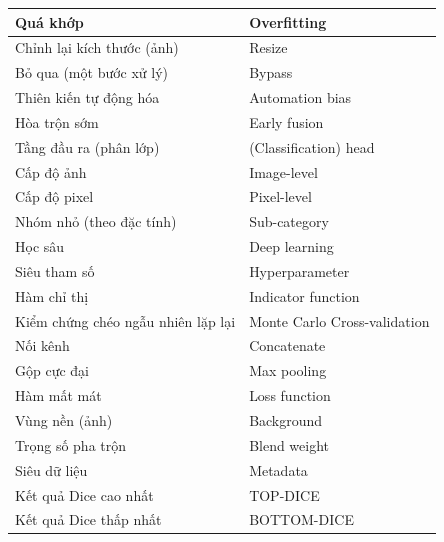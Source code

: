 \begin{longtable}{|>{\raggedright\arraybackslash}p{5.2cm}|p{8.8cm}|}
Quá khớp & Overfitting \\ \hline
Chỉnh lại kích thước (ảnh) & Resize \\ \hline
Bỏ qua (một bước xử lý) & Bypass \\ \hline
Thiên kiến tự động hóa & Automation bias \\ \hline
Hòa trộn sớm & Early fusion \\ \hline
Tầng đầu ra (phân lớp) & (Classification) head \\ \hline
Cấp độ ảnh & Image-level \\ \hline
Cấp độ pixel & Pixel-level \\ \hline
Nhóm nhỏ (theo đặc tính) & Sub-category \\ \hline
Học sâu & Deep learning \\ \hline
Siêu tham số & Hyperparameter \\ \hline
Hàm chỉ thị & Indicator function \\ \hline
Kiểm chứng chéo ngẫu nhiên lặp lại & Monte Carlo Cross-validation \\ \hline
Nối kênh & Concatenate \\ \hline
Gộp cực đại & Max pooling \\ \hline
Hàm mất mát & Loss function \\ \hline
Vùng nền (ảnh) & Background \\ \hline
Trọng số pha trộn & Blend weight \\ \hline
Siêu dữ liệu & Metadata \\ \hline
Kết quả Dice cao nhất & TOP-DICE \\ \hline
Kết quả Dice thấp nhất & BOTTOM-DICE \\ \hline
\end{longtable}
